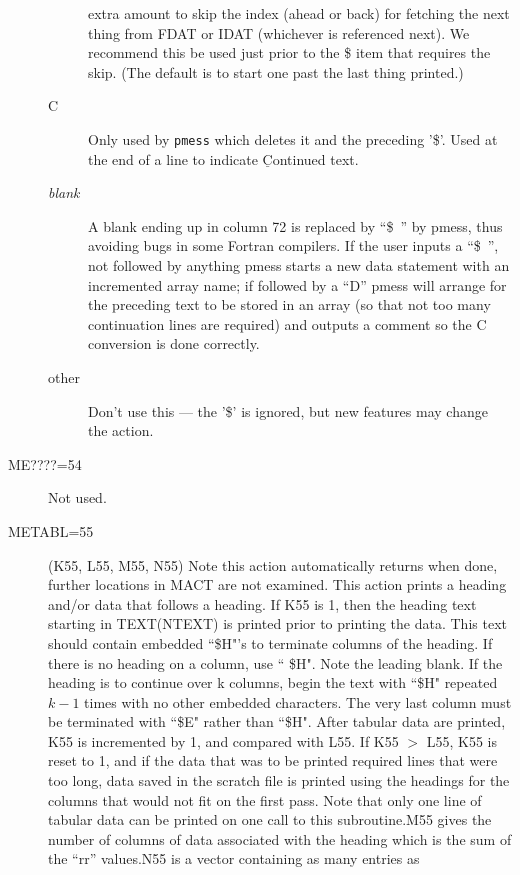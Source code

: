 \documentclass[twoside]{MATH77}
\begin{document}
\begin{description}
\begin{description}
  extra amount to skip the index (ahead or back) for fetching the next thing
  from FDAT or IDAT (whichever is referenced next).  We recommend this be used
  just prior to the \$ item that requires the skip.  (The default is to start
  one past the last thing printed.)
\item[C] Only used by {\tt pmess} which deletes it and the preceding '\$'.
        Used at the end of a line to indicate
        $\underline{\text{C}}$ontinued text.
 \item [{\em blank}] A blank ending up in column 72 is replaced by
        ``\$~'' by pmess, thus avoiding bugs in some Fortran compilers.  If
        the user inputs a ``\$~'', not followed by anything pmess starts a new
        data statement with an incremented array name; if followed by a ``D''
        pmess will arrange for the preceding text to be stored in an array (so
        that not too many continuation lines are required) and outputs a
        comment so the C conversion is done correctly.
\item[other] Don't use this --- the '\$' is ignored, but new features may
        change the action.
\end{description}
\item[ME????=54]  Not used.
\item[METABL=55] (K55, L55, M55, N55) Note this action automatically
  returns when done, further locations in MACT are not examined.  This
  action prints a heading and/or data that follows a heading.  If K55
  is 1, then the heading text starting in TEXT(NTEXT) is printed prior
  to printing the data.  This text should contain embedded ``\$H"'s to
  terminate columns of the heading.  If there is no heading on a
  column, use `` \$H".  Note the leading blank.  If the heading is to
  continue over k columns, begin the text with ``\$H" repeated $k-1$
  times with no other embedded characters.  The very last column must
  be terminated with ``\$E" rather than ``\$H".  After tabular data
  are printed, K55 is incremented by 1, and compared with L55.  If K55
  $>$ L55, K55 is reset to 1, and if the data that was to be printed
  required lines that were too long, data saved in the scratch file is
  printed using the headings for the columns that would not fit on the
  first pass.  Note that only one line of tabular data can be printed
  on one call to this subroutine.\newline M55 gives the number of
  columns of data associated with the heading which is the sum of the
  ``rr'' values.\newline N55 is a vector containing as many entries as

\end{description}
\end{document}
